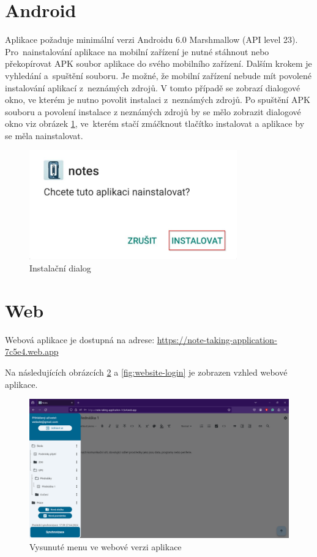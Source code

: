 \documentclass[czech, bc, kiv, he, iso690numb]{fasthesis}
\begin{document}
\section{Android}

Aplikace požaduje minimální verzi Androidu 6.0 Marshmallow (\gls{API} level 23). Pro~nainstalování aplikace na mobilní zařízení je nutné stáhnout nebo překopírovat \gls{APK} soubor aplikace do svého mobilního zařízení. Dalším krokem je vyhledání a~spuštění souboru. Je možné, že mobilní zařízení nebude mít povolené instalování aplikací z~neznámých zdrojů. V tomto případě se zobrazí dialogové okno, ve kterém je nutno povolit instalaci z~neznámých zdrojů. Po spuštění \gls{APK} souboru a povolení instalace z neznámých zdrojů by se mělo zobrazit dialogové okno viz obrázek \ref{fig:instalation-dialog}, ve~kterém stačí zmáčknout tlačítko instalovat a aplikace by se měla nainstalovat.

\begin{figure}[h!]
  \centering
  \includegraphics[width=0.8\textwidth]{img/BP-Runt/Atachment/Notes-instalation.jpg}
  \caption{Instalační dialog}
  \label{fig:instalation-dialog}
\end{figure}

\section{Web}

Webová aplikace je dostupná na adrese: \url{https://note-taking-application-7c5e4.web.app}

Na následujících obrázcích \ref{fig:website-drawer} a \ref{fig:website-login} je zobrazen vzhled webové aplikace.

\begin{figure}[h!]
  \centering
  \includegraphics[width=1\textwidth]{img/BP-Runt/Website/website-drawer.png}
  \caption{Vysunuté menu ve webové verzi aplikace}
  \label{fig:website-drawer}
\end{figure}
\end{document}

